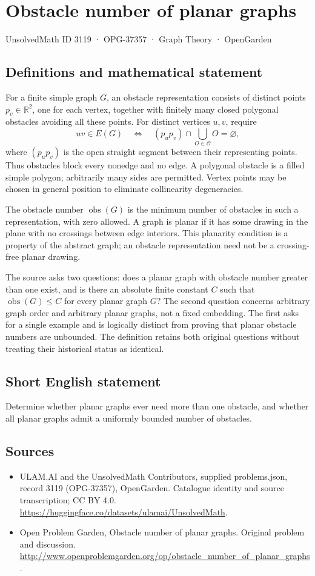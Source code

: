 \documentclass[11pt,a4paper]{article}
\begin{document}
\section*{Obstacle number of planar graphs}\label{3119}
{\small UnsolvedMath ID 3119 · OPG-37357 · Graph Theory · OpenGarden}
\subsection{Definitions and mathematical statement}
For a finite simple graph $G$, an obstacle representation consists of distinct points $p_v\in\mathbb R^2$, one for each vertex, together with finitely many closed polygonal obstacles avoiding all these points. For distinct vertices $u,v$, require
\[
 uv\in E(G)\quad\Longleftrightarrow\quad
 (p_up_v)\cap\bigcup_{O\in\mathcal O}O=\varnothing,
\]
where $(p_up_v)$ is the open straight segment between their representing points. Thus obstacles block every nonedge and no edge. A polygonal obstacle is a filled simple polygon; arbitrarily many sides are permitted. Vertex points may be chosen in general position to eliminate collinearity degeneracies.

The obstacle number $\operatorname{obs}(G)$ is the minimum number of obstacles in such a representation, with zero allowed. A graph is planar if it has some drawing in the plane with no crossings between edge interiors. This planarity condition is a property of the abstract graph; an obstacle representation need not be a crossing-free planar drawing.

The source asks two questions: does a planar graph with obstacle number greater than one exist, and is there an absolute finite constant $C$ such that $\operatorname{obs}(G)\le C$ for every planar graph $G$? The second question concerns arbitrary graph order and arbitrary planar graphs, not a fixed embedding. The first asks for a single example and is logically distinct from proving that planar obstacle numbers are unbounded. The definition retains both original questions without treating their historical status as identical.
\subsection{Short English statement}
Determine whether planar graphs ever need more than one obstacle, and whether all planar graphs admit a uniformly bounded number of obstacles.
\subsection{Sources}
\begin{itemize}
\item[S1] ULAM.AI and the UnsolvedMath Contributors, supplied problems.json, record 3119 (OPG-37357), OpenGarden. Catalogue identity and source transcription; CC BY 4.0.
\url{https://huggingface.co/datasets/ulamai/UnsolvedMath}.
\item[S2] Open Problem Garden, Obstacle number of planar graphs. Original problem and discussion.
\url{http://www.openproblemgarden.org/op/obstacle_number_of_planar_graphs}.
\end{itemize}
\end{document}
